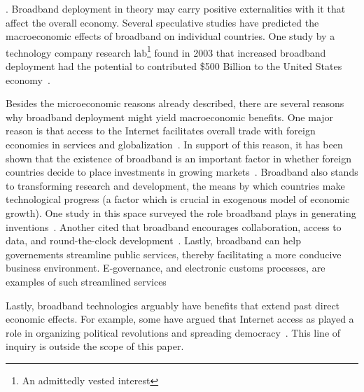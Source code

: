 . Broadband deployment in theory may
carry positive externalities with it that affect the overall economy.
Several speculative studies have predicted the macroeconomic effects of broadband
on individual countries. One study by a technology company research lab\footnote{An admittedly vested interest}
 found in 2003 that increased broadband deployment had the potential to contributed \$500 Billion to the United States
 economy~\cite{saksena2003igniting}.

 Besides the microeconomic reasons already described, there are several reasons why broadband deployment
 might yield macroeconomic benefits. One major reason is that access to the Internet facilitates overall trade with foreign economies
 in services and globalization~\cite{attendusing}. In support of this reason, it has been shown that the existence of broadband
 is an important factor in whether foreign countries decide to place investments in growing markets~\cite{abramovsky2006outsourcing}.
 Broadband also stands to transforming research and development, the means by which countries make technological progress (a factor
 which is crucial in exogenous model of economic growth). One study in this space surveyed the role broadband plays in generating
 inventions~\cite{carlaw2007past}. Another cited that broadband encourages collaboration, access to data, and round-the-clock
 development~\cite{van2008broadband}. Lastly, broadband can help governements streamline public services, thereby facilitating
 a more conducive business environment. E-governance, and electronic customs processes, are examples of such streamlined
 services~\cite{de2004customs}

Lastly, broadband technologies arguably have benefits that extend past direct economic effects. For example,
some have argued that Internet access as played a role in organizing political revolutions and spreading
democracy~\cite{zhang2010revolution}. This line of inquiry is outside the scope of this paper.
